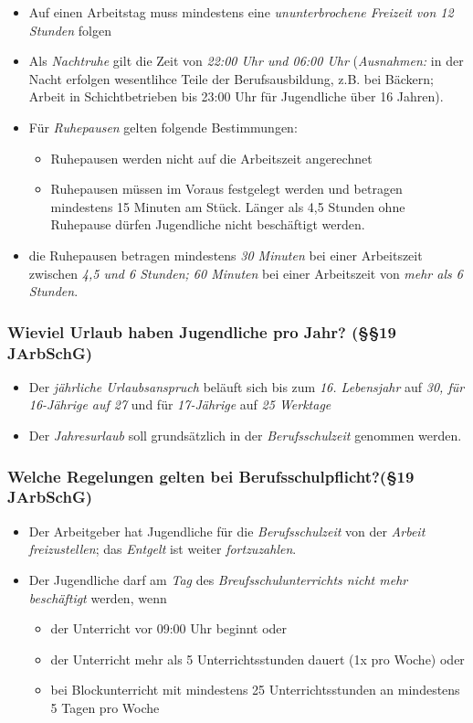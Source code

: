 \documentclass[a4paper, 12pt]{report}
\begin{document}
\begin{itemize}
    \item Auf einen Arbeitstag muss mindestens eine \emph{ununterbrochene
	Freizeit von 12 Stunden} folgen
    \item Als \emph{Nachtruhe} gilt die Zeit von \emph{22:00 Uhr und 06:00 Uhr}
	(\emph{Ausnahmen:} in der Nacht erfolgen wesentlihce Teile der
	Berufsausbildung, z.B. bei Bäckern; Arbeit in Schichtbetrieben bis
	23:00 Uhr für Jugendliche über 16 Jahren).
    \item Für \emph{Ruhepausen} gelten folgende Bestimmungen:
	\begin{itemize}
	    \item Ruhepausen werden nicht auf die Arbeitszeit angerechnet
	    \item Ruhepausen müssen im Voraus festgelegt werden und betragen
		mindestens 15 Minuten am Stück. Länger als 4,5 Stunden ohne
		Ruhepause dürfen Jugendliche nicht beschäftigt werden.
	\end{itemize}
    \item die Ruhepausen betragen mindestens \emph{30 Minuten} bei einer
	Arbeitszeit zwischen \emph{4,5 und 6 Stunden; 60 Minuten} bei einer
	Arbeitszeit von \emph{mehr als 6 Stunden}.
\end{itemize}

\subsubsection{Wieviel Urlaub haben Jugendliche pro Jahr? (\S\S 19 JArbSchG)}

\begin{itemize}
    \item Der \emph{jährliche Urlaubsanspruch} beläuft sich bis zum
	\emph{16. Lebensjahr} auf \emph{30, für 16-Jährige auf 27} und für
	\emph{17-Jährige} auf \emph{25 Werktage}
    \item Der \emph{Jahresurlaub} soll grundsätzlich in der
	\emph{Berufsschulzeit} genommen werden.
\end{itemize}

\subsubsection{Welche Regelungen gelten bei Berufsschulpflicht?(\S 19 JArbSchG)}
\begin{itemize}
    \item Der Arbeitgeber hat Jugendliche für die \emph{Berufsschulzeit} von der
	\emph{Arbeit freizustellen}; das \emph{Entgelt} ist weiter
	\emph{fortzuzahlen}.
    \item Der Jugendliche darf am \emph{Tag} des \emph{Breufsschulunterrichts
	nicht mehr beschäftigt} werden, wenn
	\begin{itemize}
	    \item der Unterricht vor 09:00 Uhr beginnt oder
	    \item der Unterricht mehr als 5 Unterrichtsstunden dauert (1x pro
		Woche) oder
	    \item bei Blockunterricht mit mindestens 25 Unterrichtsstunden an
		mindestens 5 Tagen pro Woche
	\end{itemize}
\end{itemize}
\end{document}
